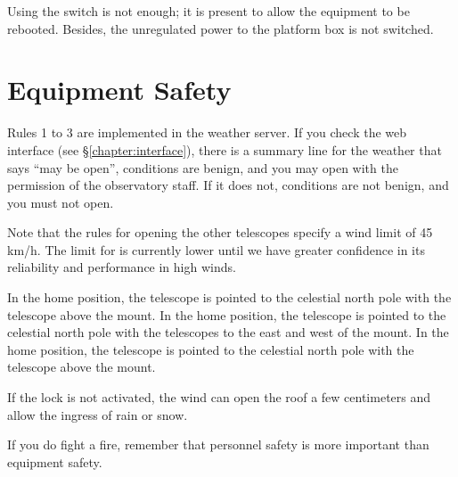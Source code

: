 Using the switch is not enough; it is present to allow the equipment to be rebooted. Besides, the unregulated power to the platform box is not switched.


\section{Equipment Safety}


Rules 1 to 3 are implemented in the {\projectname} weather server. If you check the {\projectname} web interface (see \S\ref{chapter:interface}), there is a summary line for the weather that says “may be open”, conditions are benign, and you may open with the permission of the observatory staff. If it does not, conditions are not benign, and you must not open.

Note that the rules for opening the other telescopes specify a wind limit of 45 km/h. The limit for {\projectname} is currently lower until we have greater confidence in its reliability and performance in high winds.


\ifcoatli
In the home position, the telescope is pointed to the celestial north pole with the telescope above the mount.
\fi
\ifddoti
In the home position, the telescope is pointed to the celestial north pole with the telescopes to the east and west of the mount.
\fi
\ifquetzalcoatl
In the home position, the telescope is pointed to the celestial north pole with the telescope above the mount.
\fi


If the lock is not activated, the wind can open the roof a few centimeters and allow the ingress of rain or snow.


If you do fight a fire, remember that personnel safety is more important than equipment safety.
